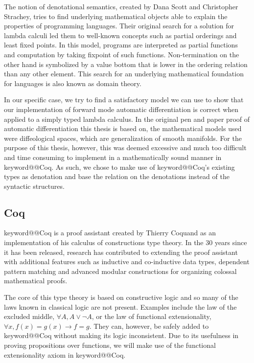 \documentclass[12pt, final]{article}
\makeatletter
\def\<#1>{\csname keyword@@#1\endcsname}
\makeatother
\begin{document}
The notion of denotational semantics, created by Dana Scott and Christopher Strachey\cite{Scott1977}, tries to find underlying mathematical objects able to explain the properties of programming languages.
Their original search for a solution for lambda calculi led them to well-known concepts such as partial orderings and least fixed points\cite{aaby2020}.
In this model, programs are interpreted as partial functions and computation by taking fixpoint of such functions.
Non-termination on the other hand is symbolized by a value bottom that is lower in the ordering relation than any other element.
This search for an underlying mathematical foundation for languages is also known as domain theory.

In our specific case, we try to find a satisfactory model we can use to show that our implementation of forward mode automatic differentiation is correct when applied to a simply typed lambda calculus.
In the original pen and paper proof of automatic differentiation this thesis is based on, the mathematical models used were diffeological spaces, which are generalization of smooth manifolds.
For the purpose of this thesis, however, this was deemed excessive and much too difficult and time consuming to implement in a mathematically sound manner in \<Coq>.
As such, we chose to make use of \<Coq>'s existing types as denotation and base the relation on the denotations instead of the syntactic structures.


\subsection{Coq}

\<Coq> is a proof assistant created by Thierry Coquand as an implementation of his calculus of constructions type theory\cite{Coquand1988}.
In the 30 years since it has been released, research has contributed to extending the proof assistant with additional features such as inductive and co-inductive data types\cite{Coquand1990}, dependent pattern matching\cite{Sozeau2010} and advanced modular constructions for organizing colossal mathematical proofs\cite{Sozeau2008}\cite{Mahboubi2013}.

The core of this type theory is based on constructive logic and so many of the laws known in classical logic are not present.
Examples include the law of the excluded middle, $\forall A, A \vee \neg A$, or the law of functional extensionality, $\forall x, f(x) = g(x) \rightarrow f = g$.
They can, however, be safely added to \<Coq> without making its logic inconsistent.
Due to its usefulness in proving propositions over functions, we will make use of the functional extensionality axiom in \<Coq>.
\end{document}
